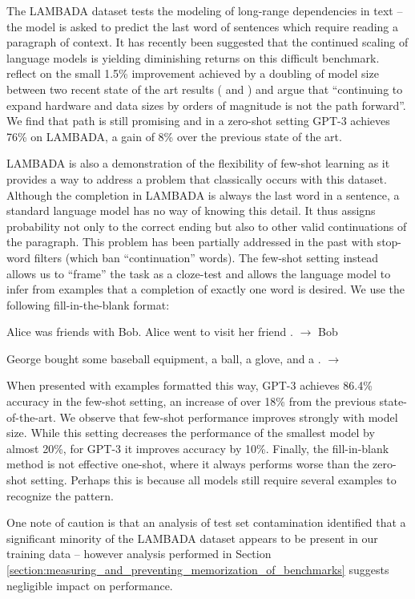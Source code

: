 



The LAMBADA dataset \cite{paperno2016lambada} tests the modeling of long-range dependencies in text -- the model is asked to predict the last word of sentences which require reading a paragraph of context. It has recently been suggested that the continued scaling of language models is yielding diminishing returns on this difficult benchmark. \cite{bisk2020experience} reflect on the small 1.5\% improvement achieved by a doubling of model size between two recent state of the art results (\cite{shoeybi2019megatronlm} and \cite{turing_17m}) and argue that ``continuing to expand hardware and data sizes by orders of magnitude is not the path forward''. We find that path is still promising and in a zero-shot setting GPT-3 achieves 76\% on LAMBADA, a gain of 8\% over the previous state of the art.

LAMBADA is also a demonstration of the flexibility of few-shot learning as it provides a way to address a problem that classically occurs with this dataset. Although the completion in LAMBADA is always the last word in a sentence, a standard language model has no way of knowing this detail. It thus assigns probability not only to the correct ending but also to other valid continuations of the paragraph. This problem has been partially addressed in the past with stop-word filters \cite{radford2019language} (which ban ``continuation'' words). The few-shot setting instead allows us to ``frame'' the task as a cloze-test and allows the language model to infer from examples that a completion of exactly one word is desired. We use the following fill-in-the-blank format:

\hspace{3cm}Alice was friends with Bob.  Alice went to visit her friend \underline{\hspace{1cm}}. $\to$ Bob

\hspace{3cm}George bought some baseball equipment, a ball, a glove, and a \underline{\hspace{1cm}}. $\to$ 

When presented with examples formatted this way, GPT-3 achieves 86.4\% accuracy in the few-shot setting, an increase of over 18\% from the previous state-of-the-art. We observe that few-shot performance improves strongly with model size. While this setting decreases the performance of the smallest model by almost 20\%, for GPT-3 it improves accuracy by 10\%. Finally, the fill-in-blank method is not effective one-shot, where it always performs worse than the zero-shot setting. Perhaps this is because all models still require several examples to recognize the pattern.

One note of caution is that an analysis of test set contamination identified that a significant minority of the LAMBADA dataset appears to be present in our training data -- however analysis performed in Section \ref{section:measuring_and_preventing_memorization_of_benchmarks} suggests negligible impact on performance.